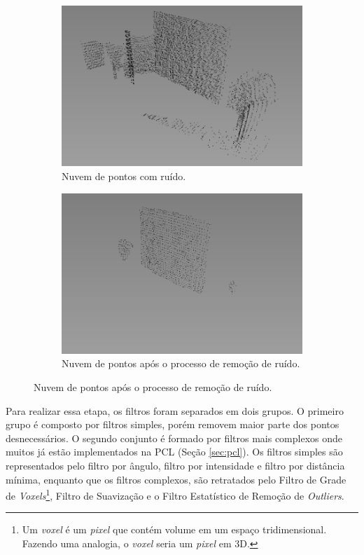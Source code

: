 \begin{figure}[H]
    \centering
    \caption{Processo de remoção de ruído em uma nuvem de pontos.}
    \label{fig:point_cloud_denoise}
    \begin{subfigure}[t]{0.49\textwidth}
        \includegraphics[width=\textwidth]{dados/figuras/pc_noise.png}
        \caption{Nuvem de pontos com ruído.}
    \end{subfigure}
    \begin{subfigure}[t]{0.49\textwidth}
        \includegraphics[width=\textwidth]{dados/figuras/pc_denoise.png}
        \caption{Nuvem de pontos após o processo de remoção de ruído.}
    \end{subfigure}
\end{figure}

Para realizar essa etapa, os filtros foram separados em dois grupos.
O primeiro grupo é composto por filtros simples, porém removem maior parte dos pontos desnecessários. 
O segundo conjunto é formado por filtros mais complexos onde muitos já estão implementados na PCL (Seção \ref{sec:pcl}).
Os filtros simples são representados pelo filtro por ângulo, filtro por intensidade e filtro por distância mínima, enquanto que os filtros complexos, são retratados pelo Filtro de Grade de \textit{Voxels}\footnote{Um \textit{voxel} é um \textit{pixel} que contém volume em um espaço tridimensional. Fazendo uma analogia, o \textit{voxel} seria um \textit{pixel} em 3D.}, Filtro de Suavização e o Filtro Estatístico de Remoção de \textit{Outliers}.


